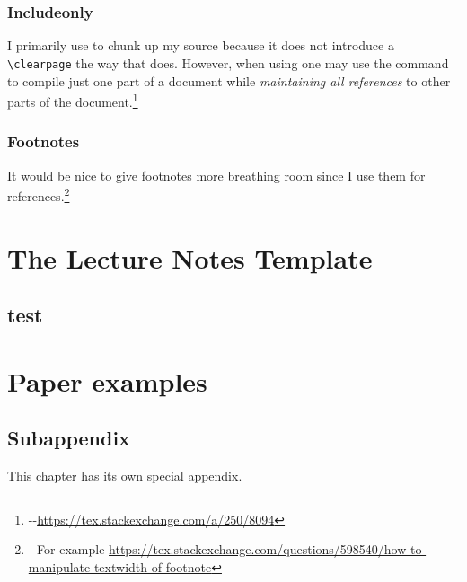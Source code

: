 \documentclass[12pt, oneside]{report}    %
\let\svfootnote\footnote
\def\footnote#1{\svfootnote{\rightskip\dimexpr
  -\marginparsep-\marginparwidth #1}}
\let\oldsection\section
\def\section{%
  \setcounter{sidenote}{1}%
  \oldsection
}
\begin{document}
\subsection{Includeonly}

I primarily use \verb!! to chunk up my source because it does not introduce a \verb!\clearpage! the way that \verb!! does. However, when using \verb!! one may use the \verb!! command to compile just one part of a document while \emph{maintaining all references} to other parts of the document.\footnote{\url{https://tex.stackexchange.com/a/250/8094}} 

\subsection{Footnotes}

It would be nice to give footnotes more breathing room since I use them for references.\footnote{For example \url{https://tex.stackexchange.com/questions/598540/how-to-manipulate-textwidth-of-footnote}}

\chapter{The Lecture Notes Template}


\section{test}
\lipsum[2]




\chapter{Paper examples}



% 

% 
% 
% 

\begin{subappendices}
\section{Subappendix}\label{sec:subappendix:eg}
This chapter has its own special appendix.
\end{subappendices}
\end{document}
